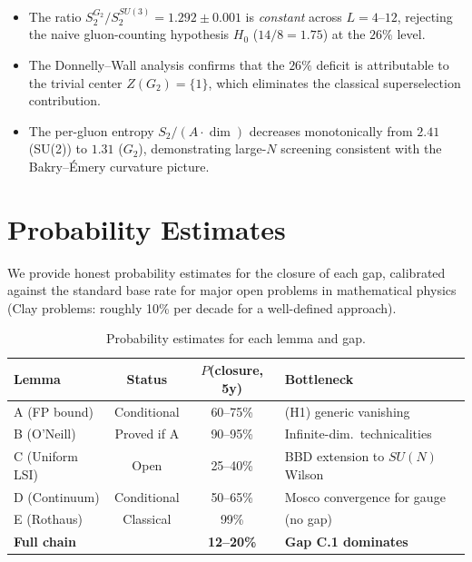 \documentclass[11pt,a4paper]{amsart}
\theoremstyle{definition}
\theoremstyle{remark}
\begin{document}
\begin{itemize}[leftmargin=2em]
\item The ratio $S_2^{G_2}/S_2^{SU(3)} = 1.292 \pm 0.001$ is \emph{constant}
      across $L = 4$--$12$, rejecting the naive gluon-counting hypothesis
      $H_0$ ($14/8 = 1.75$) at the $26\%$ level.

\item The Donnelly--Wall analysis confirms that the $26\%$ deficit is
      attributable to the trivial center $Z(G_2) = \{1\}$, which
      eliminates the classical superselection contribution.

\item The per-gluon entropy $S_2/(A \cdot \dim)$ decreases monotonically
      from $2.41$ (SU(2)) to $1.31$ ($G_2$), demonstrating large-$N$
      screening consistent with the Bakry--\'Emery curvature picture.
\end{itemize}

\section{Probability Estimates}\label{sec:probabilities}

We provide honest probability estimates for the closure of each gap,
calibrated against the standard base rate for major open problems in
mathematical physics (Clay problems: roughly 10\% per decade for a
well-defined approach).

\begin{table}[h]
\centering
\caption{Probability estimates for each lemma and gap.}
\label{tab:probabilities}
\begin{tabular}{lccl}
\toprule
Lemma & Status & $P$(closure, 5y) & Bottleneck \\
\midrule
A (FP bound) & Conditional & 60--75\% & (H1) generic vanishing \\
B (O'Neill) & Proved if A & 90--95\% & Infinite-dim.\ technicalities \\
C (Uniform LSI) & Open & 25--40\% & BBD extension to $SU(N)$ Wilson \\
D (Continuum) & Conditional & 50--65\% & Mosco convergence for gauge \\
E (Rothaus) & Classical & 99\% & (no gap) \\
\midrule
\textbf{Full chain} & & \textbf{12--20\%} & \textbf{Gap C.1 dominates} \\
\bottomrule
\end{tabular}
\end{table}
\end{document}
